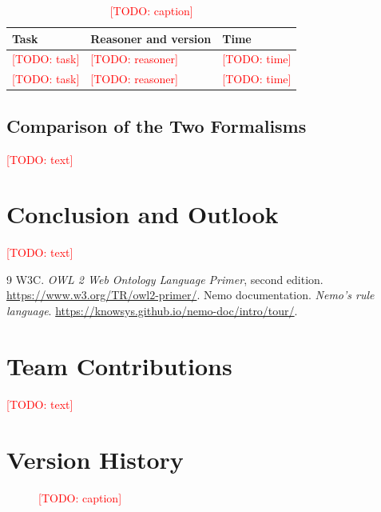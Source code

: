 \documentclass[runningheads]{llncs}
\newcommand{\todo}[1]{\textcolor{red}{[TODO: #1]}}
\begin{document}
\begin{table}[t]
\caption{\todo{caption}}
\label{tab:times}
\centering
\begin{tabular}{@{}lll@{}}
\toprule
Task & Reasoner and version & Time \\
\midrule
\todo{task} & \todo{reasoner} & \todo{time} \\
\todo{task} & \todo{reasoner} & \todo{time} \\
\bottomrule
\end{tabular}
\end{table}

\subsection{Comparison of the Two Formalisms}
\todo{text}

\section{Conclusion and Outlook}
\todo{text}


\begin{thebibliography}{9}
 W3C. \textit{OWL 2 Web Ontology Language Primer}, second edition.
  \url{https://www.w3.org/TR/owl2-primer/}.
 Nemo documentation. \textit{Nemo's rule language}.
  \url{https://knowsys.github.io/nemo-doc/intro/tour/}.
\end{thebibliography}

\appendix

\section{Team Contributions}
\todo{text}

\section{Version History}
\begin{figure}[h]
\centering
\fbox{\parbox[c][3cm][c]{0.9\textwidth}{\centering \todo{screenshot}}}
\caption{\todo{caption}}
\label{fig:history}
\end{figure}
\end{document}
